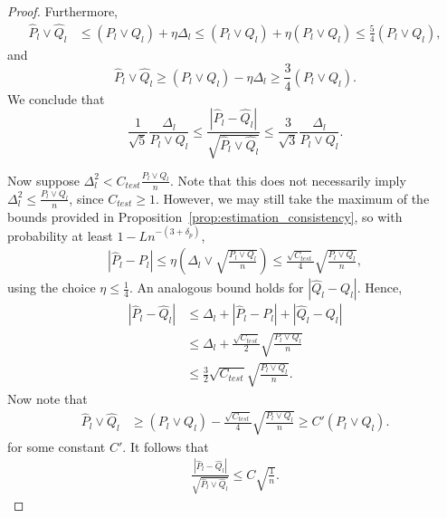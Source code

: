 \documentclass{article}
\begin{document}
\begin{proof}
Furthermore,
\begin{align*}
\hat{P}_l \vee \hat{Q}_l &\leq (P_l \vee Q_l) + \eta \Delta_l \leq (P_l \vee Q_l) + \eta (P_l \vee Q_l) \leq \frac{5}{4} (P_l \vee Q_l),
\end{align*}
and
\begin{equation*}
\hat{P}_l \vee \hat{Q}_l \ge (P_l \vee Q_l) - \eta \Delta_l \ge \frac{3}{4} (P_l \vee Q_l).
\end{equation*}
We conclude that
\[
\frac{1}{\sqrt{5}} \frac{\Delta_l}{P_l \vee Q_l} \leq \frac{ | \hat{P}_l - \hat{Q}_l | }{\sqrt{ \hat{P}_l \vee \hat{Q}_l}} \leq \frac{3}{\sqrt{3}} \frac{\Delta_l}{P_l \vee Q_l}.
\]

Now suppose $\Delta_l^2 < C_{test} \frac{P_l \vee Q_l}{n}$. Note that this does not necessarily imply  $\Delta_l^2 \leq  \frac{P_l \vee Q_l}{n}$, since $C_{test} \geq 1$. However, we may still take the maximum of the bounds provided in Proposition~\ref{prop:estimation_consistency}, so with probability at least $1 - L n^{-(3+\delta_p)}$,
\begin{align*}
|\hat{P}_l - P_l| \leq \eta \left( \Delta_l \vee \sqrt{\frac{P_l \vee Q_l}{n} } \right) \leq \frac{\sqrt{C_{test}}}{4}\sqrt{ \frac{P_l \vee Q_l}{n} },
\end{align*}
using the choice $\eta \leq \frac{1}{4}$. An analogous bound holds for $|\hat{Q}_l - Q_l|$. Hence,
\begin{align*}
|\hat{P}_l - \hat{Q}_l| &\leq \Delta_l + | \hat{P}_l - P_l| + |\hat{Q}_l - Q_l| \\
    &\leq \Delta_l + \frac{\sqrt{C_{test}}}{2} \sqrt{ \frac{P_l \vee Q_l}{n} } \\
    &\leq \frac{3}{2} \sqrt{C_{test}} \sqrt{ \frac{P_l \vee Q_l}{n} }.
\end{align*}
Now note that
\begin{align*}
\hat{P}_l \vee \hat{Q}_l &\geq (P_l \vee Q_l) - \frac{\sqrt{C_{test}}}{4} \sqrt{ \frac{P_l \vee Q_l}{n}} \geq C'(P_l \vee Q_l).
\end{align*} 
for some constant $C'$.
It follows that
\begin{align*}
\frac{| \hat{P}_l - \hat{Q}_l| }{\sqrt{ \hat{P}_l \vee \hat{Q}_l} } \leq C \sqrt{ \frac{1}{n} }.
\end{align*}
\end{proof}
\end{document}
